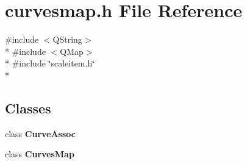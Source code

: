 \section{curvesmap.\+h File Reference}
\label{bk3_2extscaleplotscenewidget_2curvesmap_8h}
{\ttfamily \#include $<$Q\+String$>$}\\*
{\ttfamily \#include $<$Q\+Map$>$}\\*
{\ttfamily \#include \char`\"{}scaleitem.\+h\char`\"{}}\\*
\subsection*{Classes}
\begin{DoxyCompactItemize}
\item 
class {\bf Curve\+Assoc}
\item 
class {\bf Curves\+Map}
\end{DoxyCompactItemize}
